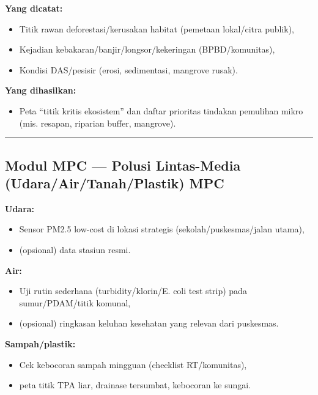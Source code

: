\documentclass[
  letterpaper,
  DIV=11,
  numbers=noendperiod]{scrreprt}
\providecommand{\tightlist}{%
  \setlength{\itemsep}{0pt}\setlength{\parskip}{0pt}}
\begin{document}
\textbf{Yang dicatat:}

\begin{itemize}
\tightlist
\item
  Titik rawan deforestasi/kerusakan habitat (pemetaan lokal/citra
  publik),
\item
  Kejadian kebakaran/banjir/longsor/kekeringan (BPBD/komunitas),
\item
  Kondisi DAS/pesisir (erosi, sedimentasi, mangrove rusak).
\end{itemize}

\textbf{Yang dihasilkan:}

\begin{itemize}
\tightlist
\item
  Peta ``titik kritis ekosistem'' dan daftar prioritas tindakan
  pemulihan mikro (mis. resapan, riparian buffer, mangrove).
\end{itemize}

\begin{center}\rule{0.5\linewidth}{0.5pt}\end{center}

\subsection{\texorpdfstring{Modul MPC --- Polusi Lintas-Media
(Udara/Air/Tanah/Plastik)
{MPC}}{Modul MPC --- Polusi Lintas-Media (Udara/Air/Tanah/Plastik) MPC}}\label{modul-mpc-polusi-lintas-media-udaraairtanahplastik-mpc}

\textbf{Udara:}

\begin{itemize}
\tightlist
\item
  Sensor PM2.5 low-cost di lokasi strategis (sekolah/puskesmas/jalan
  utama),
\item
  (opsional) data stasiun resmi.
\end{itemize}

\textbf{Air:}

\begin{itemize}
\tightlist
\item
  Uji rutin sederhana (turbidity/klorin/E. coli test strip) pada
  sumur/PDAM/titik komunal,
\item
  (opsional) ringkasan keluhan kesehatan yang relevan dari puskesmas.
\end{itemize}

\textbf{Sampah/plastik:}

\begin{itemize}
\tightlist
\item
  Cek kebocoran sampah mingguan (checklist RT/komunitas),
\item
  peta titik TPA liar, drainase tersumbat, kebocoran ke sungai.
\end{itemize}
\end{document}
